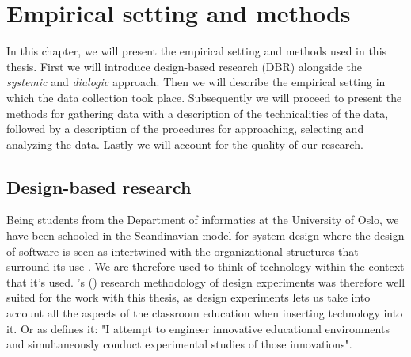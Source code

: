 \chapter{Empirical setting and methods}
In this chapter, we will present the empirical setting and methods used in this thesis. First we will introduce design-based research (DBR) alongside the \emph{systemic} and \emph{dialogic} approach. Then we will describe the empirical setting in which the data collection took place. Subsequently we will proceed to present the methods for gathering data with a description of the technicalities of the data, followed by a description of the procedures for approaching, selecting and analyzing the data. Lastly we will account for the quality of our research.


\section{Design-based research}
Being students from the Department of informatics at the University of Oslo, we have been schooled in the Scandinavian model for system design where the design of software is seen as intertwined with the organizational structures that surround its use \citep{bjerknes1987computers}. We are therefore used to think of technology within the context that it's used. \citeauthor{brown1992design}'s (\citeyear{brown1992design}) research methodology of design experiments was therefore well suited for the work with this thesis, as design experiments lets us take into account all the aspects of the classroom education when inserting technology into it. Or as \citet[p. 141]{brown1992design} defines it: "I attempt to engineer innovative educational environments and simultaneously conduct experimental studies of those innovations".


